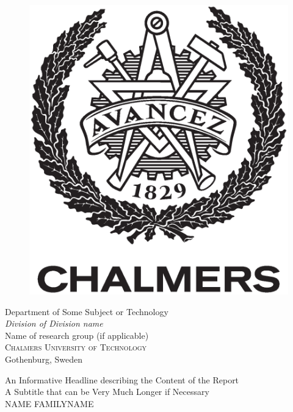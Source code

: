 \begin{center}
\begin{figure}[H]
    \includegraphics[width=0.2\pdfpagewidth]{figure/auxiliary/AvancezChalmers_black_centered.eps} \\
    \fi
	\end{figure}	\vspace{5mm}	
	
	Department of Some Subject or Technology \\
	\emph{Division of Division name}\\
	Name of research group (if applicable)\\
	\textsc{Chalmers University of Technology} \\
	Gothenburg, Sweden \the\year \\
\end{center}


\newpage
\thispagestyle{plain}
\vspace*{4.5cm}
An Informative Headline describing the Content of the Report\\
A Subtitle that can be Very Much Longer if Necessary\\
NAME FAMILYNAME \setlength{\parskip}{1cm}

